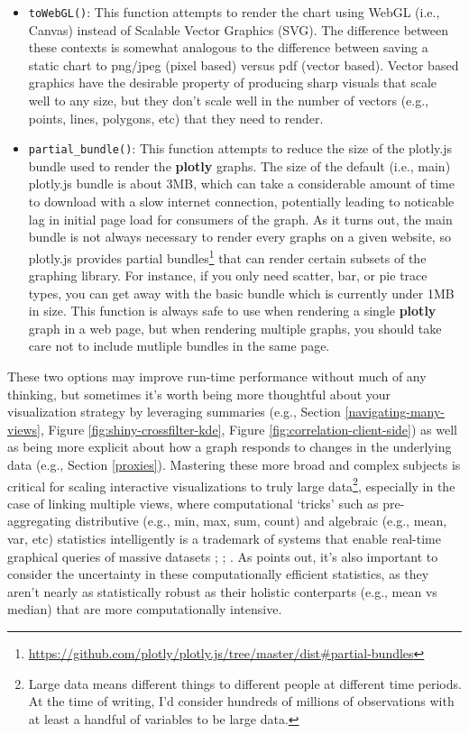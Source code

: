 \documentclass[
  12pt,
]{krantz}
\renewcommand{\href}[2]{#2\footnote{\url{#1}}}
\begin{document}
\begin{itemize}
\item
  \texttt{toWebGL()}: This function attempts to render the chart using WebGL (i.e., Canvas) instead of Scalable Vector Graphics (SVG). The difference between these contexts is somewhat analogous to the difference between saving a static chart to png/jpeg (pixel based) versus pdf (vector based). Vector based graphics have the desirable property of producing sharp visuals that scale well to any size, but they don't scale well in the number of vectors (e.g., points, lines, polygons, etc) that they need to render.
\item
  \texttt{partial\_bundle()}: This function attempts to reduce the size of the plotly.js bundle used to render the \textbf{plotly} graphs. The size of the default (i.e., main) plotly.js bundle is about 3MB, which can take a considerable amount of time to download with a slow internet connection, potentially leading to noticable lag in initial page load for consumers of the graph. As it turns out, the main bundle is not always necessary to render every graphs on a given website, so plotly.js provides \href{https://github.com/plotly/plotly.js/tree/master/dist\#partial-bundles}{partial bundles} that can render certain subsets of the graphing library. For instance, if you only need scatter, bar, or pie trace types, you can get away with the basic bundle which is currently under 1MB in size. This function is always safe to use when rendering a single \textbf{plotly} graph in a web page, but when rendering multiple graphs, you should take care not to include mutliple bundles in the same page.
\end{itemize}

These two options may improve run-time performance without much of any thinking, but sometimes it's worth being more thoughtful about your visualization strategy by leveraging summaries (e.g., Section \ref{navigating-many-views}, Figure \ref{fig:shiny-crossfilter-kde}, Figure \ref{fig:correlation-client-side}) as well as being more explicit about how a graph responds to changes in the underlying data (e.g., Section \ref{proxies}). Mastering these more broad and complex subjects is critical for scaling interactive visualizations to truly large data\footnote{Large data means different things to different people at different time periods. At the time of writing, I'd consider hundreds of millions of observations with at least a handful of variables to be large data.}, especially in the case of linking multiple views, where computational `tricks' such as pre-aggregating distributive (e.g., min, max, sum, count) and algebraic (e.g., mean, var, etc) statistics intelligently is a trademark of systems that enable real-time graphical queries of massive datasets \citep{2013-immens}; \citep{nanocubes}; \citep{2019-falcon}. As \citet{bigvis} points out, it's also important to consider the uncertainty in these computationally efficient statistics, as they aren't nearly as statistically robust as their holistic conterparts (e.g., mean vs median) that are more computationally intensive.
\end{document}
